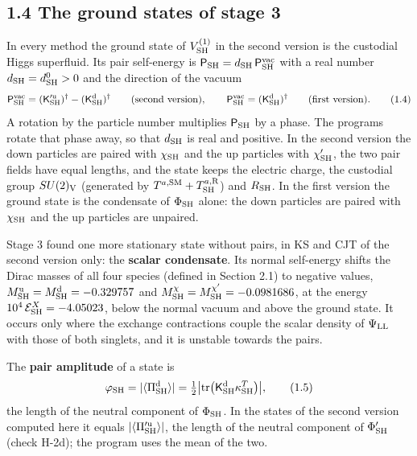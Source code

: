 \documentclass[
  10pt,
]{article}
\begin{document}
\hypertarget{the-ground-states-of-stage-3}{%
\subsection{1.4 The ground states of stage
3}\label{the-ground-states-of-stage-3}}

In every method the ground state of \(V^{(1)}_{\rm SH}\) in the second
version is the custodial Higgs superfluid. Its pair self-energy is
\(\mathsf P_{\rm SH}=d_{\rm SH}\,\mathsf P^{\rm vac}_{\rm SH}\) with a
real number \(d_{\rm SH}=d^0_{\rm SH}>0\) and the direction of the
vacuum
\[\mathsf P^{\rm vac}_{\rm SH}=(\mathsf K'^{\rm u}_{\rm SH})^\dagger-(\mathsf K^{\rm d}_{\rm SH})^\dagger\qquad\text{(second version)},\qquad
\mathsf P^{\rm vac}_{\rm SH}=(\mathsf K^{\rm d}_{\rm SH})^\dagger\qquad\text{(first version)}.\tag{1.4}\]
A rotation by the particle number multiplies \(\mathsf P_{\rm SH}\) by a
phase. The programs rotate that phase away, so that \(d_{\rm SH}\) is
real and positive. In the second version the down particles are paired
with \(\chi_{\rm SH}\) and the up particles with \(\chi'_{\rm SH}\), the
two pair fields have equal lengths, and the state keeps the electric
charge, the custodial group \(SU(2)_{\rm V}\) (generated by
\(T^{a,{\rm SM}}+T^{a,{\rm R}}_{\rm SH}\)) and \(R_{\rm SH}\). In the
first version the ground state is the condensate of \(\Phi_{\rm SH}\)
alone: the down particles are paired with \(\chi_{\rm SH}\) and the up
particles are unpaired.

Stage 3 found one more stationary state without pairs, in KS and CJT of
the second version only: the \textbf{scalar condensate}. Its normal
self-energy shifts the Dirac masses of all four species (defined in
Section 2.1) to negative values,
\(M^{\rm u}_{\rm SH}=M^{\rm d}_{\rm SH}=-0.329757\) and
\(M^\chi_{\rm SH}=M^{\chi'}_{\rm SH}=-0.0981686\), at the energy
\(10^4\,\mathcal E^X_{\rm SH}=-4.05023\), below the normal vacuum and
above the ground state. It occurs only where the exchange contractions
couple the scalar density of \(\Psi_{\rm LL}\) with those of both
singlets, and it is unstable towards the pairs.

The \textbf{pair amplitude} of a state is
\[\varphi_{\rm SH}=\lvert\langle\Pi^{\rm d}_{\rm SH}\rangle\rvert=\tfrac12\big\lvert\mathrm{tr}\big(\mathsf K^{\rm d}_{\rm SH}\kappa_{\rm SH}^T\big)\big\rvert,\tag{1.5}\]
the length of the neutral component of \(\Phi_{\rm SH}\). In the states
of the second version computed here it equals
\(\lvert\langle\Pi'^{\rm u}_{\rm SH}\rangle\rvert\), the length of the
neutral component of \(\Phi'_{\rm SH}\) (check H-2d); the program uses
the mean of the two.
\end{document}
